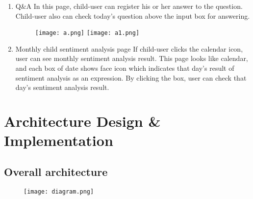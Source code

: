 \documentclass[conference]{IEEEtran}
\begin{document}
\begin{enumerate}
\begin{enumerate}
\begin{enumerate}
            \end{enumerate}
            \newpage
            \item Q\&A \hfill\break
            In this page, child-user can register his or her answer to the question. Child-user also can check today’s question above the input box for answering.
            \begin{figure}[H]
                 \centering
                 \texttt{[image: a.png]}
                 \texttt{[image: a1.png]}
                 \end{figure}
            \item Monthly child sentiment analysis page \hfill \break
            If child-user clicks the calendar icon, user can see monthly sentiment analysis result. This page looks like calendar, and each box of date shows face icon which indicates that day’s result of sentiment analysis as an expression. By clicking the box, user can check that day’s sentiment analysis result.
        \end{enumerate}
        \end{enumerate}
\newpage
\section{\large{Architecture Design \& Implementation}}
\subsection{Overall architecture}
\begin{figure}[H]
                 \centering
                 \texttt{[image: diagram.png]}
                 \end{figure}
                
\end{document}
